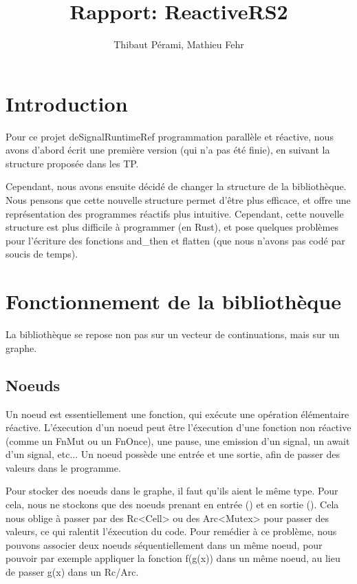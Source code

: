 \documentclass[a4paper]{article}
\title{Rapport: ReactiveRS2}
\author{Thibaut Pérami, Mathieu Fehr}
\renewcommand{\(}{\left(}
\renewcommand{\)}{\right)}
\begin{document}
\maketitle

\section{Introduction}

Pour ce projet deSignalRuntimeRef programmation parallèle et réactive, nous avons d'abord écrit
une première version (qui n'a pas été finie), en suivant la structure proposée
dans les TP.

Cependant, nous avons ensuite décidé de changer la structure de la bibliothèque.
Nous pensons que cette nouvelle structure permet d'être plus efficace, et offre
une représentation des programmes réactifs plus intuitive. Cependant, cette
nouvelle structure est plus difficile à programmer (en Rust), et pose quelques
problèmes pour l'écriture des fonctions and\_then et flatten (que nous n'avons
pas codé par soucis de temps).

\section{Fonctionnement de la bibliothèque}

La bibliothèque se repose non pas sur un vecteur de continuations, mais sur un
graphe. 

\subsection{Noeuds}

Un noeud est essentiellement une fonction, qui exécute une opération élémentaire
réactive. L'éxecution d'un noeud peut être l'éxecution d'une fonction non
réactive (comme un FnMut ou un FnOnce), une pause, une emission d'un signal, un
await d'un signal, etc... Un noeud possède une entrée et une sortie, afin de
passer des valeurs dans le programme.

Pour stocker des noeuds dans le graphe, il faut qu'ils aient le même type. Pour
cela, nous ne stockons que des noeuds prenant en entrée () et en sortie ().
Cela nous oblige à passer par des Rc<Cell> ou des Arc<Mutex> pour passer des
valeurs, ce qui ralentit l'éxecution du code. Pour remédier à ce problème, nous
pouvons associer deux noeuds séquentiellement dans un même noeud, pour pouvoir
par exemple appliquer la fonction f(g(x)) dans un même noeud, au lieu de passer
g(x) dans un Rc/Arc.
\end{document}
